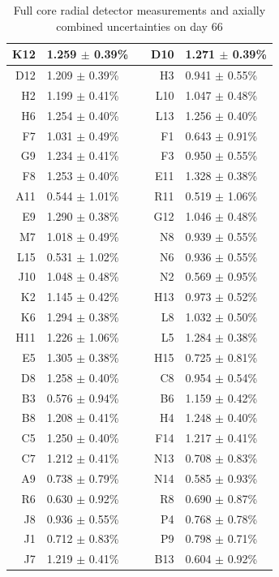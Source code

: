 \documentclass{article}
\begin{document}
\begin{table}[ht]
  \centering
  \caption{Full core radial detector measurements and axially combined uncertainties on day 66}
  \label{table:radial_combined_all_day_66}
  \begin{tabular}{|r|l|c|r|l|}
    \hline
    K12 & 1.259 $\pm$ 0.39\% & & D10 & 1.271 $\pm$ 0.39\% \\ \hline 
    D12 & 1.209 $\pm$ 0.39\% & & H3 & 0.941 $\pm$ 0.55\% \\ \hline 
    H2 & 1.199 $\pm$ 0.41\% & & L10 & 1.047 $\pm$ 0.48\% \\ \hline 
    H6 & 1.254 $\pm$ 0.40\% & & L13 & 1.256 $\pm$ 0.40\% \\ \hline 
    F7 & 1.031 $\pm$ 0.49\% & & F1 & 0.643 $\pm$ 0.91\% \\ \hline 
    G9 & 1.234 $\pm$ 0.41\% & & F3 & 0.950 $\pm$ 0.55\% \\ \hline 
    F8 & 1.253 $\pm$ 0.40\% & & E11 & 1.328 $\pm$ 0.38\% \\ \hline 
    A11 & 0.544 $\pm$ 1.01\% & & R11 & 0.519 $\pm$ 1.06\% \\ \hline 
    E9 & 1.290 $\pm$ 0.38\% & & G12 & 1.046 $\pm$ 0.48\% \\ \hline 
    M7 & 1.018 $\pm$ 0.49\% & & N8 & 0.939 $\pm$ 0.55\% \\ \hline 
    L15 & 0.531 $\pm$ 1.02\% & & N6 & 0.936 $\pm$ 0.55\% \\ \hline 
    J10 & 1.048 $\pm$ 0.48\% & & N2 & 0.569 $\pm$ 0.95\% \\ \hline 
    K2 & 1.145 $\pm$ 0.42\% & & H13 & 0.973 $\pm$ 0.52\% \\ \hline 
    K6 & 1.294 $\pm$ 0.38\% & & L8 & 1.032 $\pm$ 0.50\% \\ \hline 
    H11 & 1.226 $\pm$ 1.06\% & & L5 & 1.284 $\pm$ 0.38\% \\ \hline 
    E5 & 1.305 $\pm$ 0.38\% & & H15 & 0.725 $\pm$ 0.81\% \\ \hline 
    D8 & 1.258 $\pm$ 0.40\% & & C8 & 0.954 $\pm$ 0.54\% \\ \hline 
    B3 & 0.576 $\pm$ 0.94\% & & B6 & 1.159 $\pm$ 0.42\% \\ \hline 
    B8 & 1.208 $\pm$ 0.41\% & & H4 & 1.248 $\pm$ 0.40\% \\ \hline 
    C5 & 1.250 $\pm$ 0.40\% & & F14 & 1.217 $\pm$ 0.41\% \\ \hline 
    C7 & 1.212 $\pm$ 0.41\% & & N13 & 0.708 $\pm$ 0.83\% \\ \hline 
    A9 & 0.738 $\pm$ 0.79\% & & N14 & 0.585 $\pm$ 0.93\% \\ \hline 
    R6 & 0.630 $\pm$ 0.92\% & & R8 & 0.690 $\pm$ 0.87\% \\ \hline 
    J8 & 0.936 $\pm$ 0.55\% & & P4 & 0.768 $\pm$ 0.78\% \\ \hline 
    J1 & 0.712 $\pm$ 0.83\% & & P9 & 0.798 $\pm$ 0.71\% \\ \hline 
    J7 & 1.219 $\pm$ 0.41\% & & B13 & 0.604 $\pm$ 0.92\% \\ \hline
  \end{tabular}
\end{table}
\end{document}

